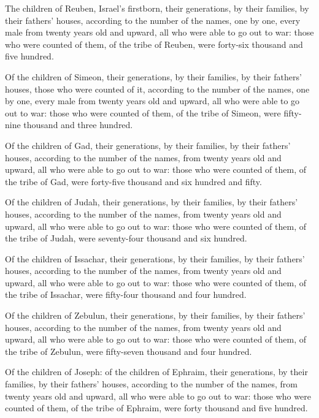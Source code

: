  The children of Reuben, Israel's firstborn, their
generations, by their families, by their fathers' houses, according to
the number of the names, one by one, every male from twenty years old
and upward, all who were able to go out to war:  those
who were counted of them, of the tribe of Reuben, were forty-six
thousand and five hundred.

 Of the children of Simeon, their generations, by their
families, by their fathers' houses, those who were counted of it,
according to the number of the names, one by one, every male from twenty
years old and upward, all who were able to go out to war:
 those who were counted of them, of the tribe of Simeon,
were fifty-nine thousand and three hundred.

 Of the children of Gad, their generations, by their
families, by their fathers' houses, according to the number of the
names, from twenty years old and upward, all who were able to go out to
war:  those who were counted of them, of the tribe of
Gad, were forty-five thousand and six hundred and fifty.

 Of the children of Judah, their generations, by their
families, by their fathers' houses, according to the number of the
names, from twenty years old and upward, all who were able to go out to
war:  those who were counted of them, of the tribe of
Judah, were seventy-four thousand and six hundred.

 Of the children of Issachar, their generations, by their
families, by their fathers' houses, according to the number of the
names, from twenty years old and upward, all who were able to go out to
war:  those who were counted of them, of the tribe of
Issachar, were fifty-four thousand and four hundred.

 Of the children of Zebulun, their generations, by their
families, by their fathers' houses, according to the number of the
names, from twenty years old and upward, all who were able to go out to
war:  those who were counted of them, of the tribe of
Zebulun, were fifty-seven thousand and four hundred.

 Of the children of Joseph: of the children of Ephraim,
their generations, by their families, by their fathers' houses,
according to the number of the names, from twenty years old and upward,
all who were able to go out to war:  those who were
counted of them, of the tribe of Ephraim, were forty thousand and five
hundred.

